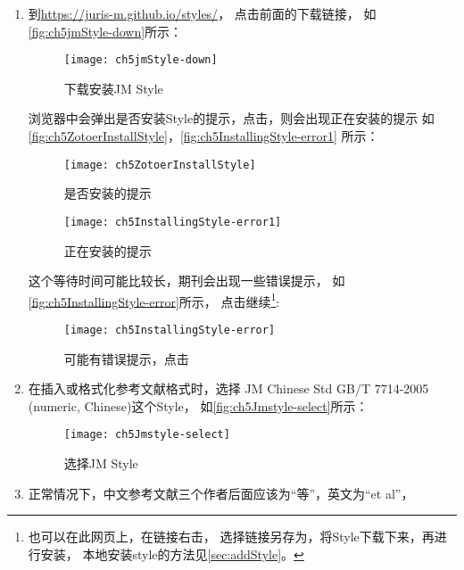 \documentclass[cn,11pt,chinese]{elegantbook}
\begin{document}
			\begin{enumerate}
				\item 到\url{https://juris-m.github.io/styles/}，
				点击前面的下载链接，
				如\autoref{fig:ch5jmStyle-down}所示：
				\begin{figure}[htbp]
					\centering
					\texttt{[image: ch5jmStyle-down]}
					\caption{下载安装JM Style}
					\label{fig:ch5jmStyle-down}
				\end{figure}
				浏览器中会弹出是否安装Style的提示，点击，则会出现正在安装的提示
				如\autoref{fig:ch5ZotoerInstallStyle}，\autoref{fig:ch5InstallingStyle-error1}
				所示：
				\begin{figure}[htbp]
					\centering
					\begin{minipage}[t]{\dimexpr0.5\textwidth-4em}
						\centering
						\texttt{[image: ch5ZotoerInstallStyle]}
						\caption{是否安装的提示}
						\label{fig:ch5ZotoerInstallStyle}
					\end{minipage}
					\begin{minipage}[t]{\dimexpr0.5\textwidth-4em}
						\centering
						\texttt{[image: ch5InstallingStyle-error1]}
						\caption{正在安装的提示}
						\label{fig:ch5InstallingStyle-error1}
					\end{minipage}
				\end{figure}
				这个等待时间可能比较长，期刊会出现一些错误提示，
				如
				\autoref{fig:ch5InstallingStyle-error}所示，
				点击继续\footnote{也可以在此网页上，在链接右击，
				选择链接另存为，将Style下载下来，再进行安装，
				本地安装style的方法见\cref{sec:addStyle}。}:
				\begin{figure}[htbp]
					\centering
						\texttt{[image: ch5InstallingStyle-error]}
						\caption{可能有错误提示，点击}
						\label{fig:ch5InstallingStyle-error}
					\end{figure}
			\item 在插入或格式化参考文献格式时，选择
				JM Chinese Std GB/T 7714-2005 (numeric, Chinese)这个Style，
				如\autoref{fig:ch5Jmstyle-select}所示：
				\begin{figure}[htbp]
					\centering
					\texttt{[image: ch5Jmstyle-select]}
					\caption{选择JM Style}
					\label{fig:ch5Jmstyle-select}
				\end{figure}
			\item 正常情况下，中文参考文献三个作者后面应该为“等”，英文为“et al”，

\end{enumerate}
\end{document}
